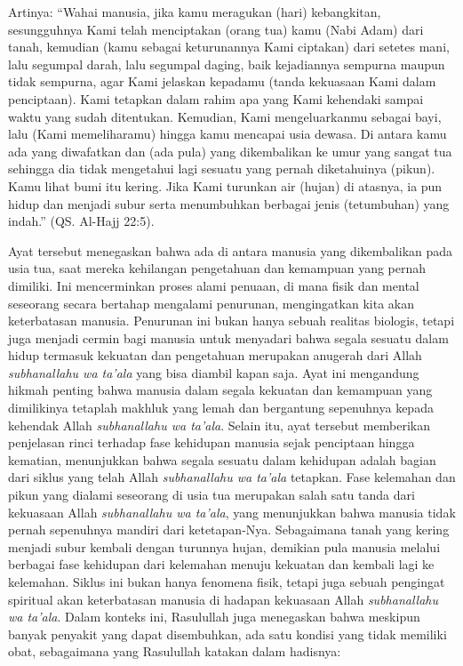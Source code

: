     Artinya: “Wahai manusia, jika kamu meragukan (hari) kebangkitan, sesungguhnya Kami telah menciptakan (orang tua) kamu (Nabi Adam) dari tanah, kemudian (kamu sebagai keturunannya Kami ciptakan) dari setetes mani, lalu segumpal darah, lalu segumpal daging, baik kejadiannya sempurna maupun tidak sempurna, agar Kami jelaskan kepadamu (tanda kekuasaan Kami dalam penciptaan). Kami tetapkan dalam rahim apa yang Kami kehendaki sampai waktu yang sudah ditentukan. Kemudian, Kami mengeluarkanmu sebagai bayi, lalu (Kami memeliharamu) hingga kamu mencapai usia dewasa. Di antara kamu ada yang diwafatkan dan (ada pula) yang dikembalikan ke umur yang sangat tua sehingga dia tidak mengetahui lagi sesuatu yang pernah diketahuinya (pikun). Kamu lihat bumi itu kering. Jika Kami turunkan air (hujan) di atasnya, ia pun hidup dan menjadi subur serta menumbuhkan berbagai jenis (tetumbuhan) yang indah.” (QS. Al-Hajj 22:5).

    Ayat tersebut menegaskan bahwa ada di antara manusia yang dikembalikan pada usia tua, saat mereka kehilangan pengetahuan dan kemampuan yang pernah dimiliki. Ini mencerminkan proses alami penuaan, di mana fisik dan mental seseorang secara bertahap mengalami penurunan, mengingatkan kita akan keterbatasan manusia. Penurunan ini bukan hanya sebuah realitas biologis, tetapi juga menjadi cermin bagi manusia untuk menyadari bahwa segala sesuatu dalam hidup termasuk kekuatan dan pengetahuan merupakan anugerah dari Allah \textit{subhanallahu wa ta'ala} yang bisa diambil kapan saja. Ayat ini mengandung hikmah penting bahwa manusia dalam segala kekuatan dan kemampuan yang dimilikinya tetaplah makhluk yang lemah dan bergantung sepenuhnya kepada kehendak Allah \textit{subhanallahu wa ta'ala}. Selain itu, ayat tersebut memberikan penjelasan rinci terhadap fase kehidupan manusia sejak penciptaan hingga kematian, menunjukkan bahwa segala sesuatu dalam kehidupan adalah bagian dari siklus yang telah Allah \textit{subhanallahu wa ta'ala} tetapkan. Fase kelemahan dan pikun yang dialami seseorang di usia tua merupakan salah satu tanda dari kekuasaan Allah \textit{subhanallahu wa ta'ala}, yang menunjukkan bahwa manusia tidak pernah sepenuhnya mandiri dari ketetapan-Nya. Sebagaimana tanah yang kering menjadi subur kembali dengan turunnya hujan, demikian pula manusia melalui berbagai fase kehidupan dari kelemahan menuju kekuatan dan kembali lagi ke kelemahan. Siklus ini bukan hanya fenomena fisik, tetapi juga sebuah pengingat spiritual akan keterbatasan manusia di hadapan kekuasaan Allah \textit{subhanallahu wa ta'ala}. Dalam konteks ini, Rasulullah juga menegaskan bahwa meskipun banyak penyakit yang dapat disembuhkan, ada satu kondisi yang tidak memiliki obat, sebagaimana yang Rasulullah katakan dalam hadisnya:

